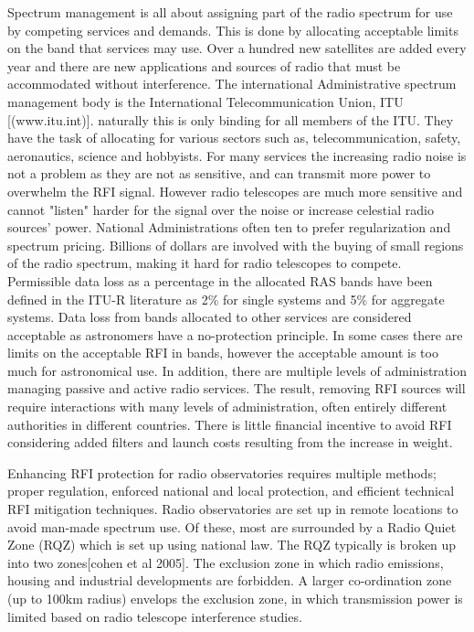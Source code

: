 Spectrum management is all about assigning part of the radio spectrum for use by competing services and demands.
This is done by allocating acceptable limits on the band that services may use.
Over a hundred new satellites are added every year and there are new applications and sources of radio that must be accommodated without interference\citep{van2009radio}.
The international Administrative spectrum management body is the International Telecommunication Union, ITU [(www.itu.int)]\citep{van2009radio}.
naturally this is only binding for all members of the ITU.
They have the task of allocating for various sectors such as, telecommunication, safety, aeronautics, science and hobbyists.
For many services the increasing radio noise is not a problem as they are not as sensitive, and can transmit more power to overwhelm the RFI signal\citep{van2009radio}.
However radio telescopes are much more sensitive and cannot "listen" harder for the signal over the noise or increase celestial radio sources' power.
National Administrations often ten to prefer regularization and spectrum pricing.
Billions of dollars are involved with the buying of small regions of the radio spectrum, making it hard for radio telescopes to compete.\citep{van2009radio}
Permissible data loss as a percentage in the allocated RAS bands have been defined in the ITU-R literature as 2\% for single systems and 5\% for aggregate systems.
Data loss from bands allocated to other services are considered acceptable as astronomers have a no-protection principle\citep{fridman2001rfi}.
In some cases there are limits on the acceptable RFI in bands, however the acceptable amount is too much for astronomical use.
In addition, there are multiple levels of administration managing passive and active radio services.
The result, removing RFI sources will require interactions with many levels of administration, often entirely different authorities in different countries.
There is little financial incentive to avoid RFI considering added filters and launch costs resulting from the increase in weight.\citep{van2009radio}

Enhancing RFI protection for radio observatories requires multiple methods; proper regulation, enforced national and local protection, and efficient technical RFI mitigation techniques\citep{fridman2001rfi}.
Radio observatories are set up in remote locations to avoid man-made spectrum use.
Of these, most are surrounded by a Radio Quiet Zone (RQZ)\citep{van2009radio} which is set up using national law.
The RQZ typically is broken up into two zones[cohen et al 2005]. 
The exclusion zone in which radio emissions, housing and industrial developments are forbidden.
A larger co-ordination zone (up to 100km radius) envelops the exclusion zone, in which transmission power is limited based on radio telescope interference studies.\citep{van2009radio}

